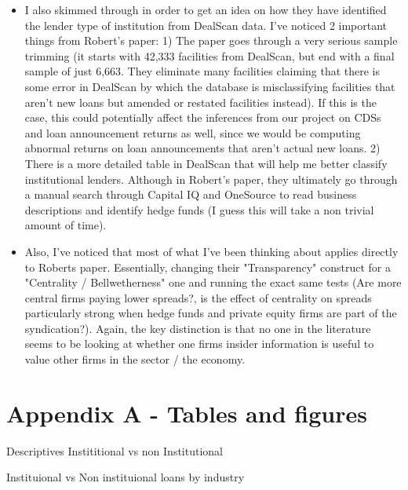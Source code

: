 \documentclass[english, 3p]{elsarticle}
\begin{document}
\begin{itemize}
\item I also skimmed through \cite{Bushman2014} in order to get an idea on how they have identified the lender type of institution from DealScan data. I've noticed 2 important things from Robert's paper: 1) The paper goes through a very serious sample trimming (it starts with 42,333 facilities from DealScan, but end with a final sample of just 6,663. They eliminate many facilities claiming that there is some error in DealScan by which the database is misclassifying facilities that aren't new loans but amended or restated facilities instead). If this is the case, this could potentially affect the inferences from our project on CDSs and loan announcement returns  as well, since we would be computing abnormal returns on loan announcements that aren't actual new loans. 2) There is a more detailed table in DealScan that will help me better classify institutional lenders. Although in Robert's paper, they ultimately go through a manual search through Capital IQ and OneSource to read business descriptions and identify hedge funds (I guess this will take a non trivial amount of time).
\item Also, I've noticed that most of what I've been thinking about applies directly to Roberts paper. Essentially, changing their "Transparency" construct for a "Centrality / Bellwetherness" one and running the exact same tests (Are more central firms paying lower spreads?, is the effect of centrality on spreads particularly strong when hedge funds and private equity firms are part of the syndication?). Again, the key distinction is that no one in the literature seems to be looking at whether one firms insider information is useful to value other firms in the sector / the economy. 



\end{itemize}

 





\setcounter{figure}{0}


\section*{Appendix A - Tables and figures}

\begin{landscape}

\begin{table}[htbp]
	\footnotesize 
	\begin{center}
	\caption{Descriptives Instititional vs non Institutional}
	\label{fig: instdescript}
		
	\end{center}
\end{table}



\begin{table}[htbp]
	\caption{Instituional vs Non instituional loans by industry}
	\label{fig: indust17}
		
\end{table}
\end{landscape}
\end{document}
